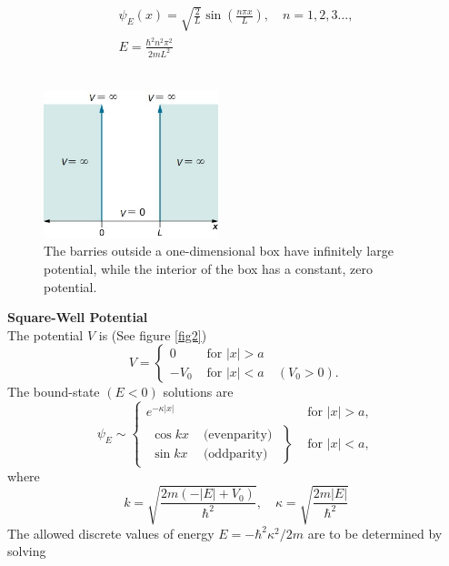 \documentclass{article}
\begin{document}
\begin{equation}
\begin{gathered}
\psi_{E}(x)=\sqrt{\frac{2}{L}} \sin \left(\frac{n \pi x}{L}\right), \quad n=1,2,3 \ldots, \\
E=\frac{\hbar^{2} n^{2} \pi^{2}}{2 m L^{2}}
\end{gathered}
\end{equation}
\\
\begin{figure}[h]
    \centering
    \includegraphics[width=2in]{img1.jpg}
    \caption{The barries outside a one-dimensional box have infinitely large potential, while the interior of the box has a constant, zero potential. } \label{fig1}
\end{figure}
\textbf{Square-Well Potential}
\\
The potential $V$ is (See figure \ref{fig2})
\begin{equation}
V= \begin{cases}0 & \text { for }|x|>a \\ -V_{0} & \text { for }|x|<a \quad\left(V_{0}>0\right).\end{cases}
\end{equation}
The bound-state $(E<0)$ solutions are
\begin{equation}
\psi_{E} \sim \begin{cases}e^{-\kappa|x|} & \text { for }|x|>a, \\
\left.\begin{array}{ll}
\cos k x & \text { (evenparity) } \\
\sin k x & \text { (oddparity) }
\end{array}\right\} & \text { for }|x|<a,\end{cases}
\end{equation}
where
\begin{equation}
k=\sqrt{\frac{2 m\left(-|E|+V_{0}\right)}{\hbar^{2}}}, \quad \kappa=\sqrt{\frac{2 m|E|}{\hbar^{2}}}
\end{equation}
The allowed discrete values of energy $E=-\hbar^{2} \kappa^{2} / 2 m$ are to be determined by solving
\end{document}
